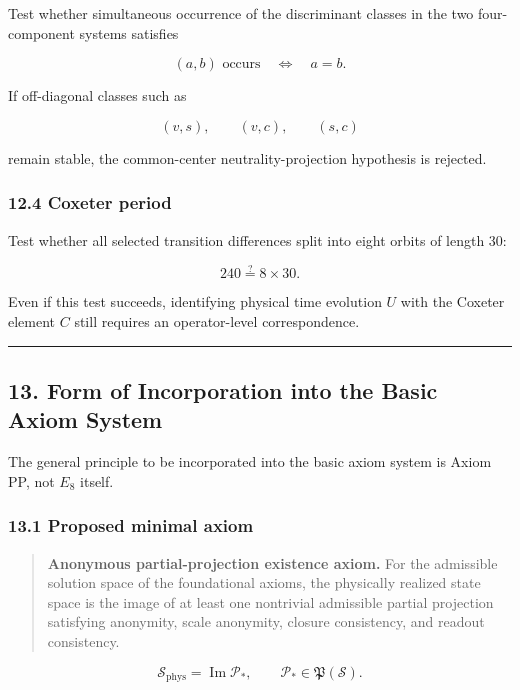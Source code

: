 \documentclass[
  a4paper,
]{article}
\begin{document}
Test whether simultaneous occurrence of the discriminant classes in the
two four-component systems satisfies

\[
(a,b)
\text{ occurs}
\quad\Longleftrightarrow\quad
a=b.
\]

If off-diagonal classes such as

\[
(v,s),\qquad(v,c),\qquad(s,c)
\]

remain stable, the common-center neutrality-projection hypothesis is
rejected.

\subsubsection{12.4 Coxeter period}\label{coxeter-period}

Test whether all selected transition differences split into eight orbits
of length 30:

\[
240
\stackrel{?}{=}
8\times30.
\]

Even if this test succeeds, identifying physical time evolution \(U\)
with the Coxeter element \(C\) still requires an operator-level
correspondence.

\begin{center}\rule{0.5\linewidth}{0.5pt}\end{center}

\subsection{13. Form of Incorporation into the Basic Axiom
System}\label{form-of-incorporation-into-the-basic-axiom-system}

The general principle to be incorporated into the basic axiom system is
Axiom PP, not \(E_8\) itself.

\subsubsection{13.1 Proposed minimal
axiom}\label{proposed-minimal-axiom}

\begin{quote}
\textbf{Anonymous partial-projection existence axiom.} For the
admissible solution space of the foundational axioms, the physically
realized state space is the image of at least one nontrivial admissible
partial projection satisfying anonymity, scale anonymity, closure
consistency, and readout consistency.
\end{quote}

\[
\mathscr S_{\mathrm{phys}}
=
\operatorname{Im}\mathcal P_*,
\qquad
\mathcal P_*
\in
\mathfrak P(\mathscr S).
\]
\end{document}
